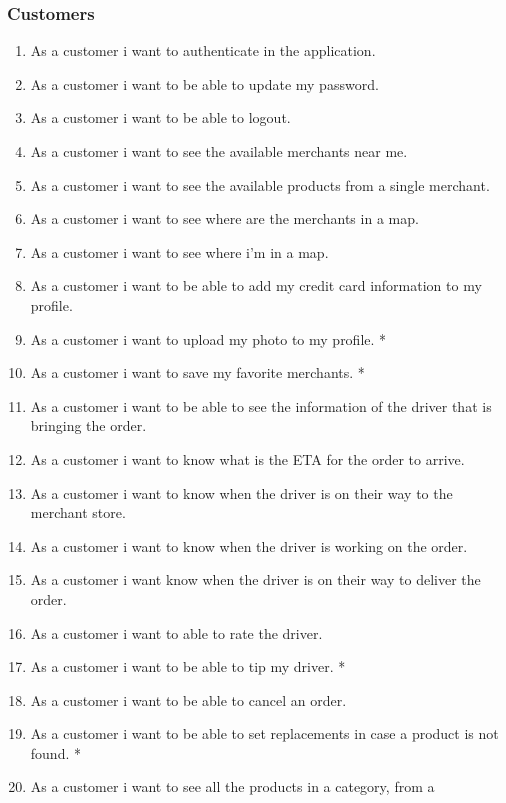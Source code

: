 \subsubsection{Customers}
\begin{enumerate}[resume, label=USR-\arabic*]
    \item As a customer i want to authenticate in the application.
    \item As a customer i want to be able to update my password.
    \item As a customer i want to be able to logout.
    \item As a customer i want to see the available merchants near me.
    \item As a customer i want to see the available products from a single 
    merchant.
    \item As a customer i want to see where are the merchants in a map.
    \item As a customer i want to see where i’m in a map.
    \item As a customer i want to be able to add my credit card information 
    to my profile.
    \item As a customer i want to upload my photo to my profile. *
    \item As a customer i want to save my favorite merchants. *
    \item As a customer i want to be able to see the information of the driver 
    that is bringing the order.
    \item As a customer i want to know what is the ETA for the order to arrive.
    \item As a customer i want to know when the driver is on their way to the 
    merchant store.
    \item As a customer i want to know when the driver is working on the order.
    \item As a customer i want know when the driver is on their way to deliver 
    the order.
    \item As a customer i want to able to rate the driver.
    \item As a customer i want to be able to tip my driver. *
    \item As a customer i want to be able to cancel an order.
    \item As a customer i want to be able to set replacements in case a 
    product is not found. *
    \item As a customer i want to see all the products in a category, from a 

\end{enumerate}
